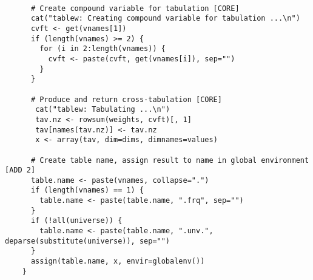 \begin{verbatim}
    
      # Create compound variable for tabulation [CORE]
      cat("tablew: Creating compound variable for tabulation ...\n")
      cvft <- get(vnames[1])
      if (length(vnames) >= 2) {
        for (i in 2:length(vnames)) {
          cvft <- paste(cvft, get(vnames[i]), sep="")
        }
      }
    
      # Produce and return cross-tabulation [CORE]
       cat("tablew: Tabulating ...\n")
       tav.nz <- rowsum(weights, cvft)[, 1]
       tav[names(tav.nz)] <- tav.nz
       x <- array(tav, dim=dims, dimnames=values)
      
      # Create table name, assign result to name in global environment [ADD 2]
      table.name <- paste(vnames, collapse=".")
      if (length(vnames) == 1) {
        table.name <- paste(table.name, ".frq", sep="")
      }
      if (!all(universe)) {
        table.name <- paste(table.name, ".unv.", deparse(substitute(universe)), sep="")
      }
      assign(table.name, x, envir=globalenv())
    }

\end{verbatim}







